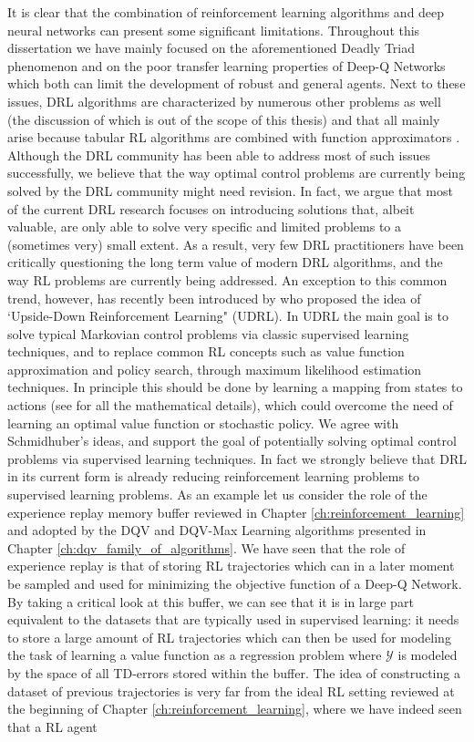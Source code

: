 It is clear that the combination of reinforcement learning algorithms and deep neural networks can present some significant limitations. Throughout this dissertation we have mainly focused on the aforementioned Deadly Triad phenomenon and on the poor transfer learning properties of Deep-Q Networks which both can limit the development of robust and general agents. Next to these issues, DRL algorithms are characterized by numerous other problems as well (the discussion of which is out of the scope of this thesis) and that all mainly arise because tabular RL algorithms are combined with function approximators \cite{tsitsiklis1997analysis,van2016deep,anschel2017averaged,fujimoto2018addressing,fujimoto2019benchmarking, kumar2019stabilizing, marklundexact}. Although the DRL community has been able to address most of such issues successfully, we believe that the way optimal control problems are currently being solved by the DRL community might need revision. In fact, we argue that most of the current DRL research focuses on introducing solutions that, albeit valuable, are only able to solve very specific and limited problems to a (sometimes very) small extent. As a result, very few DRL practitioners have been critically questioning the long term value of modern DRL algorithms, and the way RL problems are currently being addressed. An exception to this common trend, however, has recently been introduced by \citet{schmidhuber2019reinforcement} who proposed the idea of `Upside-Down Reinforcement Learning" (UDRL). In UDRL the main goal is to solve typical Markovian control problems via classic supervised learning techniques, and to replace common RL concepts such as value function approximation and policy search, through maximum likelihood estimation techniques. In principle this should be done by learning a mapping from states to actions (see \cite{srivastava2019training} for all the mathematical details), which could overcome the need of learning an optimal value function or stochastic policy. We agree with Schmidhuber's ideas, and support the goal of potentially solving optimal control problems via supervised learning techniques. In fact we strongly believe that DRL in its current form is already reducing reinforcement learning problems to supervised learning problems. As an example let us consider the role of the experience replay memory buffer reviewed in Chapter \ref{ch:reinforcement_learning} and adopted by the DQV and DQV-Max Learning algorithms presented in Chapter \ref{ch:dqv_family_of_algorithms}. We have seen that the role of experience replay is that of storing RL trajectories which can in a later moment be sampled and used for minimizing the objective function of a Deep-Q Network. By taking a critical look at this buffer, we can see that it is in large part equivalent to the datasets that are typically used in supervised learning: it needs to store a large amount of RL trajectories which can then be used for modeling the task of learning a value function as a regression problem where $\mathcal{Y}$ is modeled by the space of all TD-errors stored within the buffer. The idea of constructing a dataset of previous trajectories is very far from the ideal RL setting reviewed at the beginning of Chapter \ref{ch:reinforcement_learning}, where we have indeed seen that a RL agent 